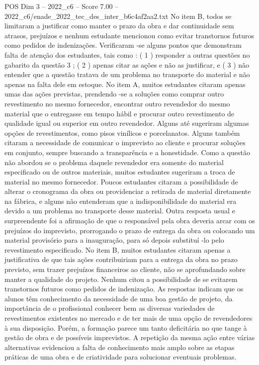 \begin{textsample}{POS Dim 3 – 2022\_c6 – Score 7.00 – 2022\_c6/enade\_2022\_tec\_des\_inter\_b6c4af2aa2.txt}
No item B, todos se limitaram a justificar como manter o prazo da obra e dar continuidade sem atrasos, prejuízos e nenhum estudante mencionou como evitar transtornos futuros como pedidos de indenizações.
Verificaram -se alguns pontos que demonstram falta de atenção dos estudantes, tais como : ( 1 ) responder a outras questões no gabarito da questão 3 ; ( 2 ) apenas citar as ações e não as justificar, e ( 3 ) não entender que a questão tratava de um problema no transporte do material e não apenas na falta dele em estoque.
No item A, muitos estudantes citaram apenas umas das ações previstas, prendendo -se a soluções como comprar outro revestimento no mesmo fornecedor, encontrar outro revendedor do mesmo material que o entregasse em tempo hábil e procurar outro revestimento de qualidade igual ou superior em outro revendedor.
Alguns até sugeriram algumas opções de revestimentos, como pisos vinílicos e porcelanatos.
Alguns também citaram a necessidade de comunicar o imprevisto ao cliente e procurar soluções em conjunto, sempre buscando a transparência e a honestidade.
Como a questão não abordou se o problema daquele revendedor era somente do material especificado ou de outros materiais, muitos estudantes sugeriram a troca de material no mesmo fornecedor.
Poucos estudantes citaram a possibilidade de alterar o cronograma da obra ou providenciar a retirada de material diretamente na fábrica, e alguns não entenderam que a indisponibilidade do material era devido a um problema no transporte desse material.
Outra resposta usual e surpreendente foi a afirmação de que o responsável pela obra deveria arcar com os prejuízos do imprevisto, prorrogando o prazo de entrega da obra ou colocando um material provisório para a inauguração, para só depois substituí -lo pelo revestimento especificado.
No item B, muitos estudantes citaram apenas a justificativa de que tais ações contribuiriam para a entrega da obra no prazo previsto, sem trazer prejuízos financeiros ao cliente, não se aprofundando sobre manter a qualidade do projeto.
Nenhum citou a possibilidade de se evitarem transtornos futuros como pedidos de indenização.
As respostas indicam que os alunos têm conhecimento da necessidade de uma boa gestão de projeto, da importância de o profissional conhecer bem as diversas variedades de revestimentos existentes no mercado e de ter mais de uma opção de revendedores à sua disposição.
Porém, a formação parece um tanto deficitária no que tange à gestão de obra e de possíveis imprevistos.
A repetição da mesma ação entre várias alternativas evidenciou a falta de conhecimento mais amplo sobre as etapas práticas de uma obra e de criatividade para solucionar eventuais problemas.

\end{textsample}
